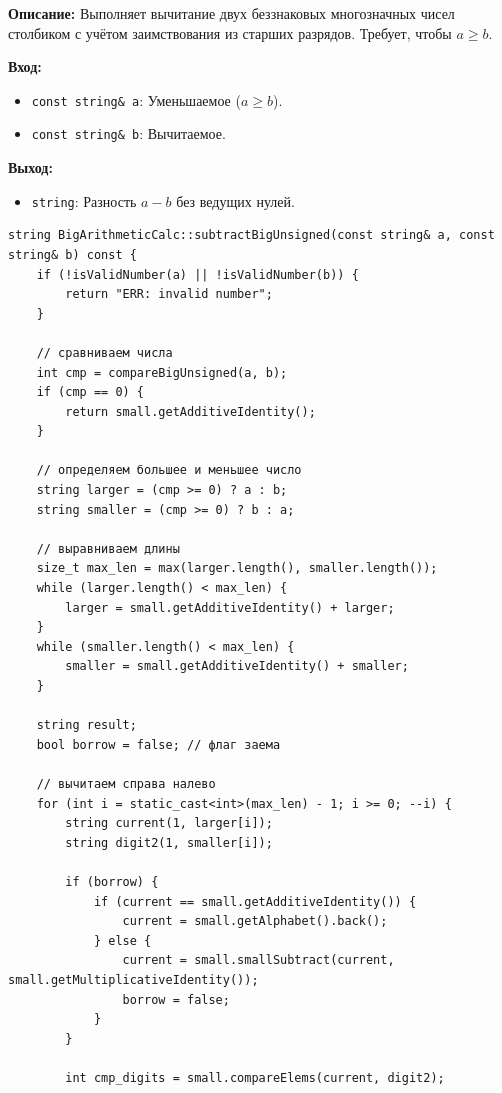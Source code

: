 \textbf{Описание:} Выполняет вычитание двух беззнаковых многозначных чисел столбиком с учётом заимствования из старших разрядов.  Требует, чтобы $a \geq b$.

\textbf{Вход:}
\begin{itemize}
    \item \texttt{const string\& a}: Уменьшаемое ($a \geq b$).
    \item \texttt{const string\& b}: Вычитаемое. 
\end{itemize}

\textbf{Выход:}
\begin{itemize}
    \item \texttt{string}: Разность $a - b$ без ведущих нулей.
\end{itemize}

\begin{lstlisting}[style=cstyle, caption={Реализация subtractBigUnsigned()}]
string BigArithmeticCalc::subtractBigUnsigned(const string& a, const string& b) const {
    if (!isValidNumber(a) || !isValidNumber(b)) {
        return "ERR: invalid number";
    }
    
    // сравниваем числа
    int cmp = compareBigUnsigned(a, b);
    if (cmp == 0) {
        return small.getAdditiveIdentity();
    }
    
    // определяем большее и меньшее число
    string larger = (cmp >= 0) ? a : b;
    string smaller = (cmp >= 0) ? b : a;

    // выравниваем длины
    size_t max_len = max(larger.length(), smaller.length());
    while (larger.length() < max_len) {
        larger = small.getAdditiveIdentity() + larger;
    }
    while (smaller.length() < max_len) {
        smaller = small.getAdditiveIdentity() + smaller;
    }

    string result;
    bool borrow = false; // флаг заема

    // вычитаем справа налево
    for (int i = static_cast<int>(max_len) - 1; i >= 0; --i) {
        string current(1, larger[i]);
        string digit2(1, smaller[i]);
        
        if (borrow) {
			if (current == small.getAdditiveIdentity()) {
                current = small.getAlphabet().back();
            } else {
                current = small.smallSubtract(current, small.getMultiplicativeIdentity());
                borrow = false;
            }
        }
        
        int cmp_digits = small.compareElems(current, digit2);
        

\end{lstlisting}

